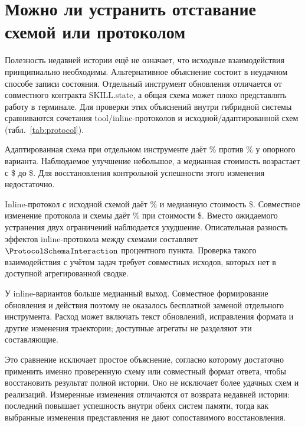 \section{Можно ли устранить отставание схемой или протоколом}
\label{sec:protocol}
Полезность недавней истории ещё не означает, что исходные взаимодействия принципиально необходимы. Альтернативное объяснение состоит в неудачном способе записи состояния. Отдельный инструмент обновления отличается от совместного контракта SKILL.state, а общая схема может плохо представлять работу в терминале. Для проверки этих объяснений внутри гибридной системы сравниваются сочетания tool/inline-протоколов и исходной/адаптированной схем (табл.~\ref{tab:protocol}).

\begin{table}[htbp]
\centering\small
\caption{Протокол и схема внутри гибридного состояния без недавней истории,
в тех же двух панелях, что и табл.~\ref{tab:composition}. Гибридные сводки
не позволяют восстановить парные отношения стоимости, пиковый промпт
и cache hit (--).}
\label{tab:protocol}
\resizebox{\linewidth}{!}{}

\medskip
\resizebox{\linewidth}{!}{}
\end{table}

Адаптированная схема при отдельном инструменте даёт \TaskAdaptedRate\% против \HybridRate\% у опорного варианта. Наблюдаемое улучшение небольшое, а медианная стоимость возрастает с \$\HybridCostMedian{} до \$\TaskAdaptedCostMedian{}. Для восстановления контрольной успешности этого изменения недостаточно.

Inline-протокол с исходной схемой даёт \InlineRate\% и медианную стоимость \$\InlineCostMedian{}. Совместное изменение протокола и схемы даёт \InlineAdaptedRate\% при стоимости \$\InlineAdaptedCostMedian{}. Вместо ожидаемого устранения двух ограничений наблюдается ухудшение. Описательная разность эффектов inline-протокола между схемами составляет $\ProtocolSchemaInteraction$ процентного пункта. Проверка такого взаимодействия с учётом задач требует совместных исходов, которых нет в доступной агрегированной сводке.

У inline-вариантов больше медианный выход. Совместное формирование обновления и действия поэтому не оказалось бесплатной заменой отдельного инструмента. Расход может включать текст обновлений, исправления формата и другие изменения траектории; доступные агрегаты не разделяют эти составляющие.

Это сравнение исключает простое объяснение, согласно которому достаточно применить именно проверенную схему или совместный формат ответа, чтобы восстановить результат полной истории. Оно не исключает более удачных схем и реализаций. Измеренные изменения отличаются от возврата недавней истории: последний повышает успешность внутри обеих систем памяти, тогда как выбранные изменения представления не дают сопоставимого восстановления.
